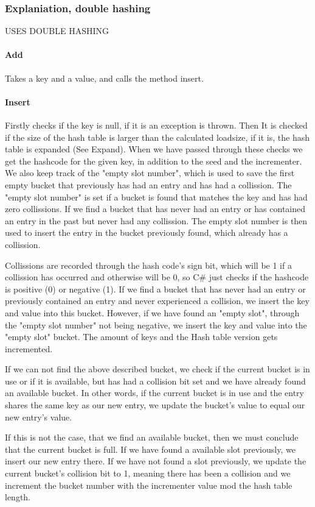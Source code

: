\documentclass[titlepage]{article}
\begin{document}
	\subsubsection{Explaniation, double hashing}
	USES DOUBLE HASHING
	\paragraph{Add}
	Takes a key and a value, and calls the method insert.
	\paragraph{Insert}
	Firstly checks if the key is null, if it is an exception is thrown.
	Then It is checked if the size of the hash table is larger than the calculated loadsize, if it is, the hash table is expanded (See Expand).
	When we have passed through these checks we get the hashcode for the given key, in addition to the seed and the incrementer. 
	We also keep track of the "empty slot number", which is used to save the first empty bucket that previously has had an entry and has had a collission. 
	The "empty slot number" is set if a bucket is found that matches the key and has had zero collissions.
		If we find a bucket that has never had an entry or has contained an entry in the past but never had any collission.
		The empty slot number is then used to insert the entry in the bucket previously found, which already has a collission. 
		
	Collissions are recorded through the hash code's sign bit, which will be 1 if a collission has occurred and otherwise will be 0, so C\# just checks if the hashcode is positive (0) or negative (1). 
	If we find a bucket that has never had an entry or previously contained an entry and never experienced a collision, we insert the key and value into this bucket. However, if we have found an "empty slot", through the "empty slot number" not being negative, we insert the key and value into the "empty slot" bucket.
	The amount of keys and the Hash table version gets incremented.
	
	If we can not find the above described bucket, we check if the current bucket is in use or if it is available, but has had a collision bit set and we have already found an available bucket. In other words, if the current bucket is in use and the entry shares the same key as our new entry, we update the bucket's value to equal our new entry's value.
	
	If this is not the case, that we find an available bucket, then we must conclude that the current bucket is full. If we have found a available slot previously, we insert our new entry there. If we have not found a slot previously, we update the current bucket's collision bit to 1, meaning there has been a collision and we increment the bucket number with the incrementer value mod the hash table length. 
	
\end{document}
